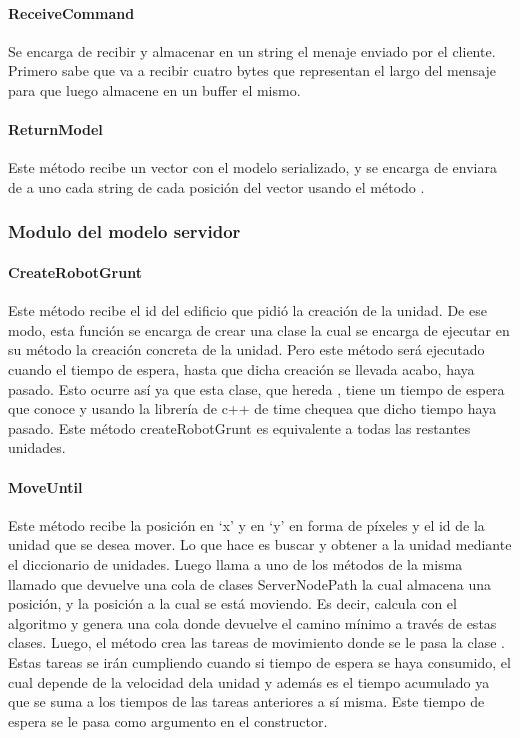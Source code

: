         \paragraph{ReceiveCommand}
            Se encarga de recibir y almacenar en un string el menaje enviado por
            el cliente. Primero sabe que va a recibir cuatro bytes que
            representan el largo del mensaje para que luego almacene en un
            buffer el mismo.
        \paragraph{ReturnModel}
            Este método recibe un vector con el modelo serializado, y se encarga
            de enviara de a uno cada string de cada posición del vector usando
            el método .
    \subsubsection{Modulo del modelo servidor}
        \paragraph{CreateRobotGrunt}
            Este método recibe el id del edificio que pidió la creación de la
            unidad. De ese modo, esta función se encarga de crear una clase
             la cual se encarga de ejecutar en
            su método  la creación concreta de la unidad. Pero
            este método será ejecutado cuando el tiempo de espera, hasta que
            dicha creación se llevada acabo, haya pasado. Esto ocurre así ya
            que esta clase, que hereda , tiene un tiempo de
            espera que conoce y usando la librería de c++ de time chequea que
            dicho tiempo haya pasado. Este método createRobotGrunt es
            equivalente a todas las restantes unidades.
        \paragraph{MoveUntil}
            Este método recibe la posición en ‘x’ y en ‘y’ en forma de píxeles
            y el id de la unidad que se desea mover. Lo que hace es buscar y
            obtener a la unidad mediante el diccionario de unidades. Luego
            llama a uno de los métodos de la misma llamado  que
            devuelve una cola de clases ServerNodePath la cual almacena una
            posición, y la posición a la cual se está moviendo. Es decir,
            calcula con el algoritmo  y genera una cola donde
            devuelve el camino mínimo a través de estas clases. Luego, el método
             crea las tareas de movimiento 
            donde se le pasa la clase . Estas tareas se irán
            cumpliendo cuando si tiempo de espera se haya consumido, el cual
            depende de la velocidad dela unidad y además es el tiempo acumulado
            ya que se suma a los tiempos de las tareas anteriores a sí misma.
            Este tiempo de espera se le pasa como argumento en el constructor.
